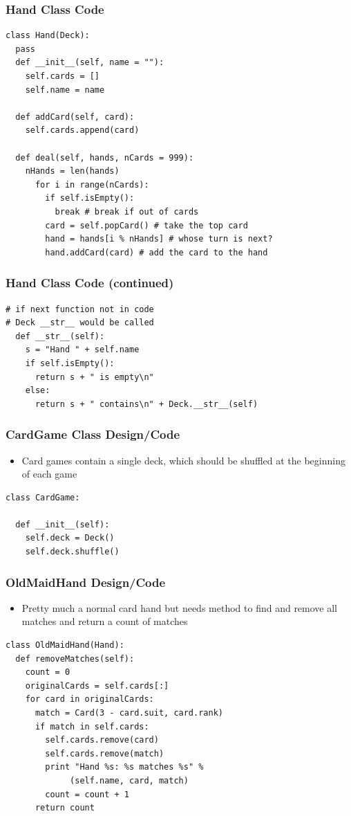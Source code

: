 \documentclass{beamer}
\begin{document}
\begin{frame}[fragile]
\frametitle{Hand Class Code}
\fontvi
\begin{lstlisting}
class Hand(Deck):
  pass
  def __init__(self, name = ""):
    self.cards = []
    self.name = name

  def addCard(self, card):
    self.cards.append(card)

  def deal(self, hands, nCards = 999):
    nHands = len(hands)
      for i in range(nCards):
        if self.isEmpty():
          break # break if out of cards
        card = self.popCard() # take the top card
        hand = hands[i % nHands] # whose turn is next?
        hand.addCard(card) # add the card to the hand
\end{lstlisting}
\end{frame}

\begin{frame}[fragile]
\frametitle{Hand Class Code (continued)}
\fontvi
\begin{lstlisting}
# if next function not in code 
# Deck __str__ would be called
  def __str__(self):
    s = "Hand " + self.name
    if self.isEmpty():
      return s + " is empty\n"
    else:
      return s + " contains\n" + Deck.__str__(self)
\end{lstlisting}
\end{frame}

\begin{frame}[fragile]
\frametitle{CardGame Class Design/Code}
\fontvi
\begin{itemize}
\item Card games contain a single deck, which should be shuffled at the beginning of each game
\end{itemize}
\begin{lstlisting}
class CardGame:

  def __init__(self):
    self.deck = Deck()
    self.deck.shuffle()
\end{lstlisting}
\end{frame}

\begin{frame}[fragile]
\frametitle{OldMaidHand Design/Code}
\fontvi
\begin{itemize}
\item Pretty much a normal card hand but needs method to find and remove all matches and return a count of matches
\end{itemize}
\begin{lstlisting}
class OldMaidHand(Hand):
  def removeMatches(self):
    count = 0
    originalCards = self.cards[:]
    for card in originalCards:
      match = Card(3 - card.suit, card.rank)
      if match in self.cards:
        self.cards.remove(card)
        self.cards.remove(match)
        print "Hand %s: %s matches %s" % 
             (self.name, card, match)
        count = count + 1
      return count

\end{lstlisting}
\end{frame}
\end{document}
